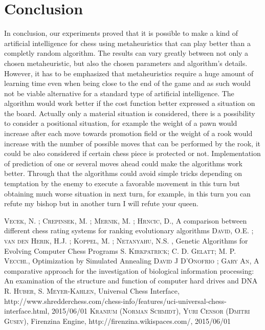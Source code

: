 \documentclass[pdftex]{article}
\begin{document}
\section{Conclusion}
\label{sec:conclusion}

In conclusion, our experiments proved that it is possible to make a kind of artificial intelligence for chess using metaheuristics that can play better than a completly random algorithm. The results can vary greatly between not only a chosen metaheuristic, but also the chosen parameters and algorithm's details. However, it has to be emphasized that metaheuristics require a huge amount of learning time even when being close to the end of the game and as such would not be viable alternative for a standard type of artificial intelligence.
The algorithm would work better if the cost function better expressed a situation on the board. Actually only a material situation is considered, there is a possibility to consider a positional situation, for example the weight of a pawn would increase after each move towards promotion field or the weight of a rook would increase with the number of possible moves that can be performed by the rook, it could be also considered if certain chess piece is protected or not.
Implementation of prediction of one or several moves ahead could make the algorithms work better. Through that the algorithms could avoid simple tricks depending on temptation by the enemy to execute a favorable movement in this turn but obtaining much worse situation in next turn, for example, in this turn you can refute my bishop but in another turn I will refute your queen.

\begin{thebibliography}{99}

 \textsc{Vecek, N. ; Crepinsek, M. ; Mernik, M. ; Hrncic, D.}, A comparison between different chess rating systems for ranking evolutionary algorithms 
 \textsc{David, O.E. ; van den Herik, H.J. ; Koppel, M. ; Netanyahu, N.S. }, Genetic Algorithms for Evolving Computer Chess Programs 
 \textsc{S. Kirkpatrick; C. D. Gelatt; M. P. Vecchi.}, Optimization by Simulated Annealing 
 \textsc{David J D’Onofrio ; Gary An}, A comparative approach for the investigation of biological information processing: An examination of the structure and function of computer hard drives and DNA
 \textsc{R. Huber, S. Meyer-Kahlen}, Universal Chess Interface, http://www.shredderchess.com/chess-info/features/uci-universal-chess-interface.html, 2015/06/01
 \textsc{Kranium (Norman Schmidt), Yuri Censor (Dmitri Gusev)}, Firenzina Engine, http://firenzina.wikispaces.com/, 2015/06/01
\end{thebibliography}
\end{document}
